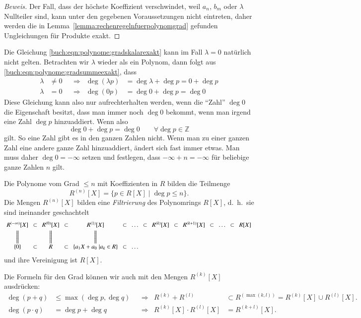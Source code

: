 \begin{proof}[Beweis]
Der Fall, dass der höchste Koeffizient verschwindet, weil $a_n$, $b_m$
oder $\lambda$ Nullteiler sind, kann unter den gegebenen Voraussetzungen
nicht eintreten, daher werden die in
Lemma~\ref{lemma:rechenregelnfuerpolynomgrad} gefunden Ungleichungen
für Produkte exakt.
\end{proof}

Die Gleichung
\eqref{buch:eqn:polynome:gradskalarexakt}
kann im Fall $\lambda=0$ natürlich nicht gelten.
Betrachten wir $\lambda$ wieder als ein Polynom, dann folgt aus
\eqref{buch:eqn:polynome:gradsummeexakt}, dass
\[
\begin{aligned}
\lambda&\ne 0  &&\Rightarrow& \deg (\lambda p) &= \deg\lambda + \deg p = 0+\deg p
\\
\lambda&=0     &&\Rightarrow& \deg (0 p) &= \deg 0 + \deg p = \deg 0
\end{aligned}
\]
Diese Gleichung kann also nur aufrechterhalten werden, wenn die ``Zahl'' $\deg 0$ die Eigenschaft besitzt, dass man immer noch $\deg 0$ bekommt,
wenn man irgend eine Zahl $\deg p$ hinzuaddiert. Wenn also
\[\deg 0 + \deg p = \deg 0 \qquad \forall \deg p \in \mathbb Z\]
gilt.
So eine Zahl gibt es in den ganzen Zahlen nicht.
Wenn man zu einer ganzen Zahl eine andere ganze Zahl hinzuaddiert, ändert sich fast immer etwas.
Man muss daher $\deg 0 = -\infty$ setzen und festlegen, dass
$-\infty + n = -\infty$ für beliebige ganze Zahlen $n$ gilt.

\begin{definition}
\label{buch:def:definitionen:polynomfilterung}
Die Polynome vom Grad $\le n$ mit Koeffizienten in $R$
bilden die Teilmenge
\[
R^{(n)}[X]
=
\{ p\in R[X]\;|\; \deg p \le n\}.
\]
Die Mengen $R^{(n)}[X]$ bilden eine {\em Filtrierung} des Polynomrings
$R[X]$, d.~h.~sie sind ineinander geschachtelt
\[
\arraycolsep=4pt
\begin{array}{ccccccccccccccc}
R^{(-\infty)}[X] & \subset
	& R^{(0)}[X] & \subset
		& R^{(1)}[X] & \subset & \dots & \subset
			& R^{(k)}[X] & \subset
				& R^{(k+1)}[X] & \subset & \dots & \subset
					& R[X]\\[3pt]
\bigg\| &
	&\bigg\| &
		&\bigg\| & & &
			&&
				&& & &
					&
\\[3pt]
\{0\} & \subset
	& R & \subset
		& \{a_1X+a_0\;|a_k\in R\} & \subset & \dots &
\end{array}
\]
und ihre Vereinigung ist $R[X]$.
\end{definition}

Die Formeln für den Grad können wir auch mit den Mengen $R^{(k)}[X]$
ausdrücken:
\begin{align*}
\deg (p+q) &\le \max(\deg p, \deg q)
&&\Rightarrow&
R^{(k)}+R^{(l)}
&\subset R^{(\max(k,l))}
=
R^{(k)}[X] \cup R^{(l)}[X].
\\
\deg (p\cdot q)&=\deg p+\deg q
&&\Rightarrow&
R^{(k)}[X] \cdot R^{(l)}[X]
&=
R^{(k+l)}[X].
\end{align*}


